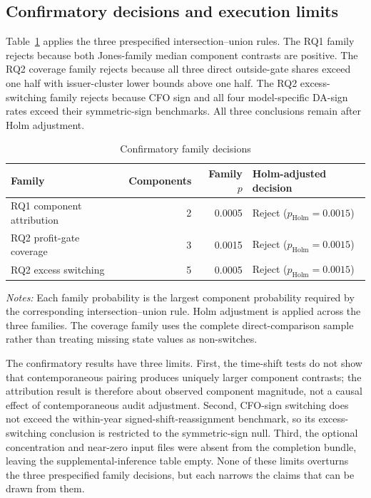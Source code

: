 \subsection{Confirmatory decisions and execution limits}\label{subsec:results_confirmatory}

Table~\ref{tab:confirmatory_summary} applies the three prespecified intersection--union rules. The RQ1 family rejects because both Jones-family median component contrasts are positive. The RQ2 coverage family rejects because all three direct outside-gate shares exceed one half with issuer-cluster lower bounds above one half. The RQ2 excess-switching family rejects because CFO sign and all four model-specific DA-sign rates exceed their symmetric-sign benchmarks. All three conclusions remain after Holm adjustment.

\begin{table}[htbp]
\centering
\caption{Confirmatory family decisions}
\label{tab:confirmatory_summary}
\small
\begin{tabular}{lrrl}
\toprule
Family & Components & Family $p$ & Holm-adjusted decision \\
\midrule
RQ1 component attribution & 2 & 0.0005 & Reject ($p_{\mathrm{Holm}}=0.0015$) \\
RQ2 profit-gate coverage & 3 & 0.0015 & Reject ($p_{\mathrm{Holm}}=0.0015$) \\
RQ2 excess switching & 5 & 0.0005 & Reject ($p_{\mathrm{Holm}}=0.0015$) \\
\bottomrule
\end{tabular}
\begin{minipage}{0.94\textwidth}\footnotesize
\textit{Notes:} Each family probability is the largest component probability required by the corresponding intersection--union rule. Holm adjustment is applied across the three families. The coverage family uses the complete direct-comparison sample rather than treating missing state values as non-switches.
\end{minipage}
\end{table}

The confirmatory results have three limits. First, the time-shift tests do not show that contemporaneous pairing produces uniquely larger component contrasts; the attribution result is therefore about observed component magnitude, not a causal effect of contemporaneous audit adjustment. Second, CFO-sign switching does not exceed the within-year signed-shift-reassignment benchmark, so its excess-switching conclusion is restricted to the symmetric-sign null. Third, the optional concentration and near-zero input files were absent from the completion bundle, leaving the supplemental-inference table empty. None of these limits overturns the three prespecified family decisions, but each narrows the claims that can be drawn from them.
